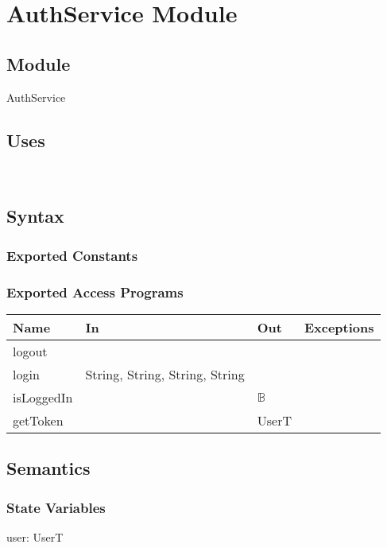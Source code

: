 \documentclass[12pt, titlepage]{article}
\begin{document}
\newpage

\section{AuthService Module} \label{AuthService} 
\subsection{Module}

AuthService

\subsection{Uses}
\\

\subsection{Syntax}

\subsubsection{Exported Constants}

\subsubsection{Exported Access Programs}

\begin{center}
\begin{tabular}{ | p{2cm} | p{4cm} | p{4cm} |  p{3cm} |}
\hline
\textbf{Name} & \textbf{In} & \textbf{Out} & \textbf{Exceptions} \\
\hline
logout &  &  &  \\
login & String, String, String, String & & \\
isLoggedIn &  &  $\mathbb{B}$ &  \\
getToken &  &  UserT &  \\
\hline
\end{tabular}
\end{center}

\subsection{Semantics}

\subsubsection{State Variables}
user: UserT
\end{document}

